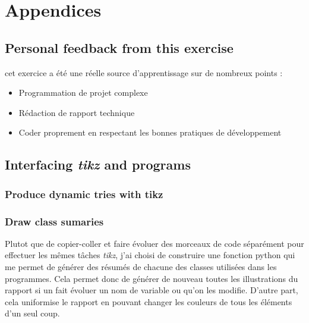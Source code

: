 \documentclass[10pt,a4paper,hidelinks]{article}
\begin{document}
\section{Appendices}
\subsection{Personal feedback from this exercise}
cet exercice a été une réelle source d'apprentissage sur de nombreux points :
\begin{itemize}
    \item Programmation de projet complexe
    \item Rédaction de rapport technique
    \item Coder proprement en respectant les bonnes pratiques de développement
\end{itemize}
\subsection{Interfacing \textit{tikz} and programs}
\subsubsection{Produce dynamic tries with tikz}

\subsubsection{Draw class sumaries}
Plutot que de copier-coller et faire évoluer des morceaux de code séparément pour effectuer les mêmes tâches \textit{tikz}, j'ai choisi de construire une fonction python qui me permet de générer des résumés de chacune des classes utilisées dans les programmes. Cela permet donc de générer de nouveau toutes les illustrations du rapport si un fait évoluer un nom de variable ou qu'on les modifie. D'autre part, cela uniformise le rapport en pouvant changer les couleurs de tous les éléments d'un seul coup.



\newpage
\listoffigures
\lstlistoflistings
\listoftables
\end{document}
